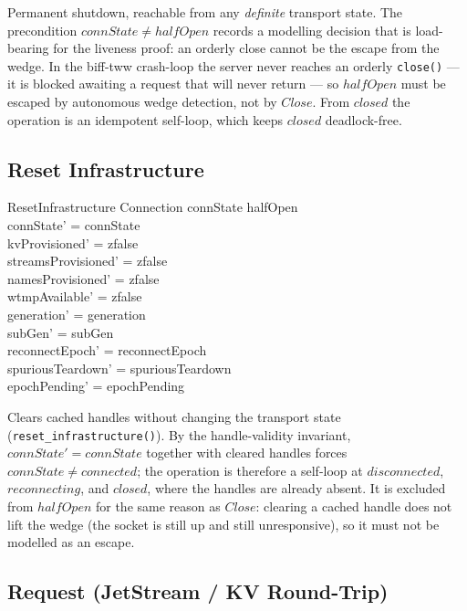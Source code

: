\documentclass[a4paper,10pt,fleqn]{article}
\begin{document}
Permanent shutdown, reachable from any \emph{definite} transport
state.  The precondition $connState \neq halfOpen$ records a
modelling decision that is load-bearing for the liveness proof:
an orderly close cannot be the escape from the wedge.  In the
biff-tww crash-loop the server never reaches an orderly
\texttt{close()} --- it is blocked awaiting a request that will
never return --- so $halfOpen$ must be escaped by autonomous
wedge detection, not by $Close$.  From $closed$ the operation is
an idempotent self-loop, which keeps $closed$ deadlock-free.

\subsection{Reset Infrastructure}

\begin{schema}{ResetInfrastructure}
  \Delta Connection
  \where
  connState \neq halfOpen \\
  connState' = connState \\
  kvProvisioned' = zfalse \\
  streamsProvisioned' = zfalse \\
  namesProvisioned' = zfalse \\
  wtmpAvailable' = zfalse \\
  generation' = generation \\
  subGen' = subGen \\
  reconnectEpoch' = reconnectEpoch \\
  spuriousTeardown' = spuriousTeardown \\
  epochPending' = epochPending
\end{schema}

Clears cached handles without changing the transport state
(\texttt{reset\_infrastructure()}).  By the handle-validity
invariant, $connState' = connState$ together with cleared handles
forces $connState \neq connected$; the operation is therefore a
self-loop at $disconnected$, $reconnecting$, and $closed$, where
the handles are already absent.  It is excluded from $halfOpen$
for the same reason as $Close$: clearing a cached handle does not
lift the wedge (the socket is still up and still unresponsive),
so it must not be modelled as an escape.

\subsection{Request (JetStream / KV Round-Trip)}
\end{document}
